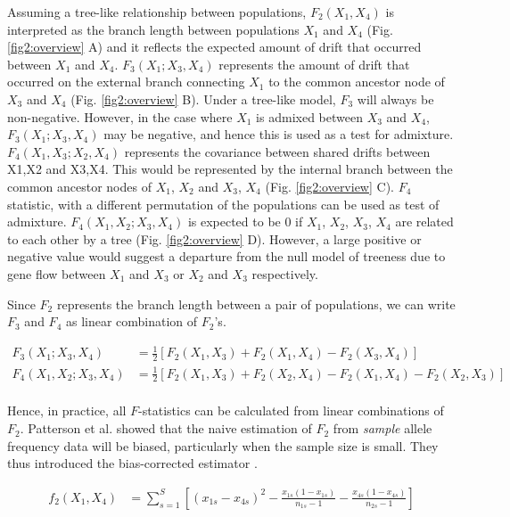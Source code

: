 \documentclass[12pt, letterpaper]{article}
\begin{document}
Assuming a tree-like relationship between populations, $F_2(X_1,X_4)$ is interpreted as the branch length between populations $X_1$ and $X_4$ (Fig. \ref{fig2:overview} A) and it reflects the expected amount of drift that occurred between $X_1$ and $X_4$. $F_3(X_1;X_3,X_4)$ represents the amount of drift that occurred on the external branch connecting $X_1$ to the common ancestor node of $X_3$ and $X_4$ (Fig. \ref{fig2:overview} B). Under a tree-like model, $F_3$ will always be non-negative. However, in the case where $X_1$ is admixed between $X_3$ and $X_4$, $F_3(X_1;X_3,X_4)$ may be negative, and hence this is used as a test for admixture\cite{peter_admixture_2016, patterson_ancient_2012}. $F_4(X_1,X_3;X_2,X_4)$ represents the covariance between shared drifts between X1,X2 and X3,X4. This would be represented by the internal branch between the common ancestor nodes of $X_1$, $X_2$ and $X_3$, $X_4$ (Fig. \ref{fig2:overview} C). $F_4$ statistic, with a different permutation of the populations can be used as test of admixture. $F_4(X_1,X_2;X_3,X_4)$ is expected to be 0 if $X_1$, $X_2$, $X_3$, $X_4$ are related to each other by a tree (Fig. \ref{fig2:overview} D). However, a large positive or negative value would suggest a departure from the null model of treeness due to gene flow between $X_1$ and $X_3$ or $X_2$ and $X_3$ respectively.

Since $F_2$ represents the branch length between a pair of populations, we can write $F_3$ and $F_4$ as linear combination of $F_2$'s.

\begin{align}\label{eq:f3_f4}
F_3(X_1;X_3,X_4) &= \frac{1}{2} [F_2(X_1,X_3) + F_2(X_1,X_4) - F_2(X_3,X_4)]\nonumber\\
F_4(X_1,X_2;X_3,X_4) &= \frac{1}{2} [F_2(X_1,X_3) + F_2(X_2,X_4) - F_2(X_1,X_4) - F_2(X_2,X_3)]\nonumber\\
\end{align}

Hence, in practice, all $F$-statistics can be calculated from linear combinations of $F_2$. Patterson et al. showed that the naive estimation of $F_2$ from \emph{sample} allele frequency data will be biased, particularly when the sample size is small. They thus  introduced the bias-corrected estimator \cite{peter_admixture_2016, patterson_ancient_2012}.


\begin{align}\label{eq:f2_correction}
f_2(X_1,X_4) &= \sum_{s=1}^S[(x_{1s} - x_{4s})^2 - \frac{x_{1s}(1-x_{1s})}{n_{1s}-1} - \frac{x_{4s}(1-x_{4s})}{n_{2s}-1}]
\end{align}\label{eq:f2_error}
\end{document}
